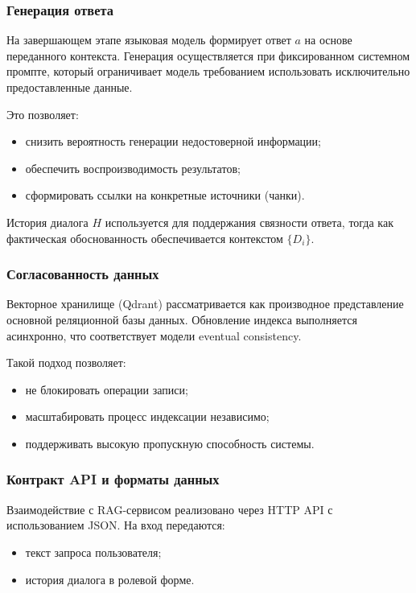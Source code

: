 \documentclass{article}
\begin{document}
\subsubsection{Генерация ответа}

На завершающем этапе языковая модель формирует ответ $a$ на основе переданного контекста. Генерация осуществляется при фиксированном системном промпте, который ограничивает модель требованием использовать исключительно предоставленные данные.

Это позволяет:
\begin{itemize}
\item снизить вероятность генерации недостоверной информации;
\item обеспечить воспроизводимость результатов;
\item сформировать ссылки на конкретные источники (чанки).
\end{itemize}

История диалога $H$ используется для поддержания связности ответа, тогда как фактическая обоснованность обеспечивается контекстом $\{D_i\}$.

\subsubsection{Согласованность данных}

Векторное хранилище (Qdrant) рассматривается как производное представление основной реляционной базы данных. Обновление индекса выполняется асинхронно, что соответствует модели eventual consistency.

Такой подход позволяет:
\begin{itemize}
\item не блокировать операции записи;
\item масштабировать процесс индексации независимо;
\item поддерживать высокую пропускную способность системы.
\end{itemize}

\subsubsection{Контракт API и форматы данных}

Взаимодействие с RAG-сервисом реализовано через HTTP API с использованием JSON. На вход передаются:
\begin{itemize}
\item текст запроса пользователя;
\item история диалога в ролевой форме.
\end{itemize}
\end{document}
